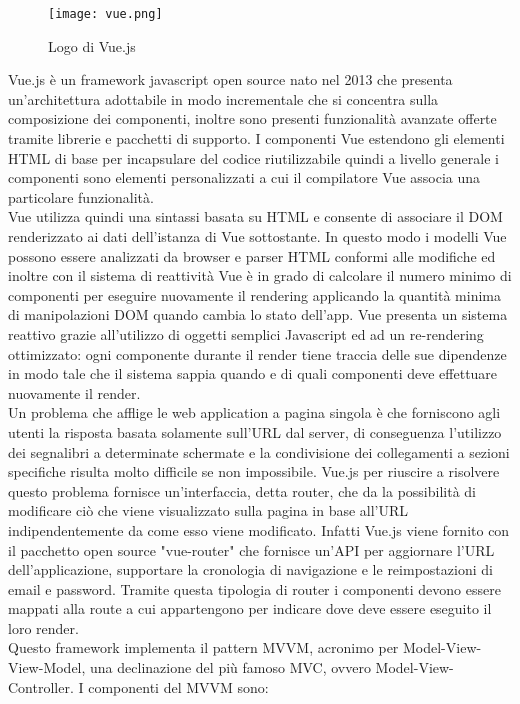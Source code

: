 \begin{figure}[H]
	\begin{center}
		\texttt{[image: vue.png]}
		\caption{Logo di Vue.js}
	\end{center}
\end{figure}
Vue.js è un framework javascript open source nato nel 2013 che presenta un'architettura adottabile in modo incrementale che si concentra sulla composizione dei componenti, inoltre sono presenti funzionalità avanzate offerte tramite librerie e pacchetti di supporto. I componenti Vue estendono gli elementi HTML di base per incapsulare del codice riutilizzabile quindi a livello generale i componenti sono elementi personalizzati a cui il compilatore Vue associa una particolare funzionalità.\\
Vue utilizza quindi una sintassi basata su HTML e consente di associare il DOM renderizzato ai dati dell'istanza di Vue sottostante. In questo modo i modelli Vue possono essere analizzati da browser e parser HTML conformi alle modifiche ed inoltre con il sistema di reattività Vue è in grado di calcolare il numero minimo di componenti per eseguire nuovamente il rendering applicando la quantità minima di manipolazioni DOM quando cambia lo stato dell'app. Vue presenta un sistema reattivo grazie all'utilizzo di oggetti semplici Javascript ed ad un re-rendering ottimizzato: ogni componente durante il render tiene traccia delle sue dipendenze in modo tale che il sistema sappia quando e di quali componenti deve effettuare nuovamente il render.\\
Un problema che afflige le web application a pagina singola è che forniscono agli utenti la risposta basata solamente sull'URL dal server, di conseguenza l'utilizzo dei segnalibri a determinate schermate e la condivisione dei collegamenti a sezioni specifiche risulta molto difficile se non impossibile. Vue.js per riuscire a risolvere questo problema fornisce un'interfaccia, detta router, che da la possibilità di modificare ciò che viene visualizzato sulla pagina in base all'URL indipendentemente da come esso viene modificato. Infatti Vue.js viene fornito con il pacchetto open source "vue-router" che fornisce un'API per aggiornare l'URL dell'applicazione, supportare la cronologia di navigazione e le reimpostazioni di email e password. Tramite questa tipologia di router i componenti devono essere mappati alla route a cui appartengono per indicare dove deve essere eseguito il loro render.\\
Questo framework implementa il pattern MVVM, acronimo per Model-View-View-Model, una declinazione del più famoso MVC, ovvero Model-View-Controller. I componenti del MVVM sono:
